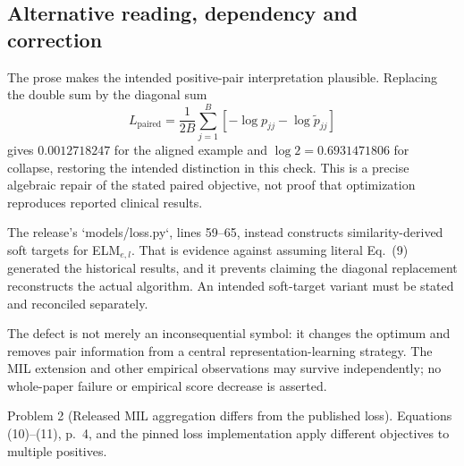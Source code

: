 \documentclass[10pt]{article}
\begin{document}
\subsection*{Alternative reading, dependency and correction}
The prose makes the intended positive-pair interpretation plausible. Replacing the double sum by the diagonal sum \[L_{\mathrm{paired}}=
\frac{1}{2B}\sum_{j=1}^B
[-\log p_{jj}-\log\widetilde p_{jj}]\] gives \(0.0012718247\) for the aligned example and \(\log2=0.6931471806\) for collapse, restoring the intended distinction in this check. This is a precise algebraic repair of the stated paired objective, not proof that optimization reproduces reported clinical results.\par
The release’s `models/loss.py`, lines 59–65, instead constructs similarity-derived soft targets for ELM\(_{e,l}\). That is evidence against assuming literal Eq. (9) generated the historical results, and it prevents claiming the diagonal replacement reconstructs the actual algorithm. An intended soft-target variant must be stated and reconciled separately.\par
The defect is not merely an inconsequential symbol: it changes the optimum and removes pair information from a central representation-learning strategy. The MIL extension and other empirical observations may survive independently; no whole-paper failure or empirical score decrease is asserted.\par
Problem 2 (Released MIL aggregation differs from the published loss).  Equations (10)–(11), p. 4, and the pinned loss implementation apply different objectives to multiple positives.\par
\end{document}

